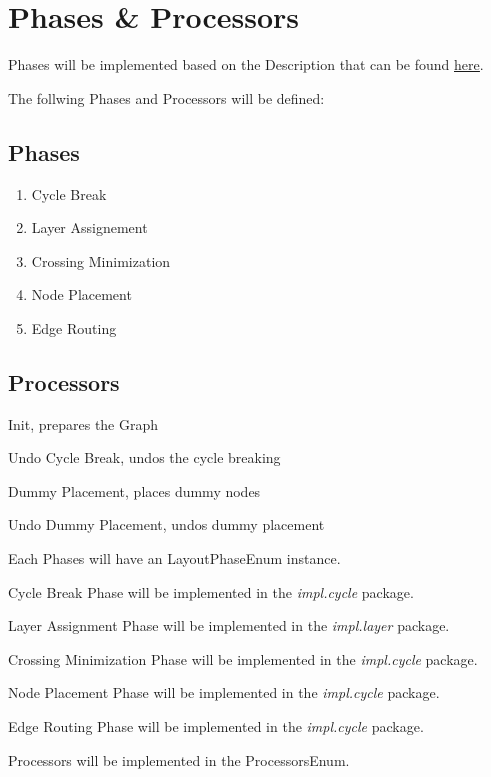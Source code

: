 \section{Phases \& Processors}

Phases will be implemented based on the Description that can be found \underline{
\href{https://www.eclipse.org/elk/documentation/algorithmdevelopers/algorithmimplementation/algorithmstructure.html}{here}}.

The follwing Phases and Processors will be defined:

\subsection{Phases}
\begin{enumerate}
\item Cycle Break
\item Layer Assignement
\item Crossing Minimization
\item Node Placement
\item Edge Routing
\end{enumerate}

\subsection{Processors}
\begin{list}{-}{}
\item Init, prepares the Graph
\item Undo Cycle Break, undos the cycle breaking
\item Dummy Placement, places dummy nodes
\item Undo Dummy Placement, undos dummy placement
\end{list}

Each Phases will have an LayoutPhaseEnum instance.

Cycle Break Phase will be implemented in the \textit{impl.cycle} package.

Layer Assignment Phase will be implemented in the \textit{impl.layer} package.

Crossing Minimization Phase will be implemented in the \textit{impl.cycle} package.

Node Placement Phase will be implemented in the \textit{impl.cycle} package.

Edge Routing Phase will be implemented in the \textit{impl.cycle} package.

Processors will be implemented in the ProcessorsEnum.


